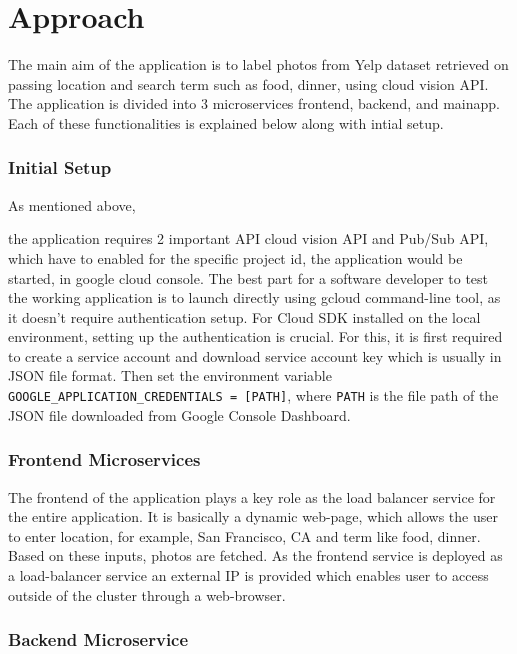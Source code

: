 \section{Approach}

The main aim of the application is to label photos from Yelp dataset
retrieved on passing location and search term such as food, dinner,
using cloud vision API. The application is divided into 3
microservices frontend, backend, and mainapp. Each of these
functionalities is explained below along with intial setup.

\subsubsection{Initial Setup} 

As mentioned above, 


the application requires 2 important API cloud
vision API and Pub/Sub API, which have to enabled for the specific
project id, the application would be started, in google cloud
console. The best part for a software developer to test the working
application is to launch directly using gcloud command-line tool, as
it doesn’t require authentication setup.  For Cloud SDK installed on
the local environment, setting up the authentication is crucial. For
this, it is first required to create a service account and download
service account key which is usually in JSON file format. Then set the
environment variable \verb|GOOGLE_APPLICATION_CREDENTIALS = [PATH]|,
where \verb|PATH| is the file path of the JSON file downloaded from Google
Console Dashboard.

\subsubsection{Frontend Microservices} 

The frontend of the application plays a key role as the load balancer
service for the entire application. It is basically a dynamic
web-page, which allows the user to enter location, for example, San
Francisco, CA and term like food, dinner. Based on these inputs,
photos are fetched. As the frontend service is deployed as a
load-balancer service an external IP is provided which enables user to
access outside of the cluster through a web-browser.

\subsubsection{Backend Microservice} 

